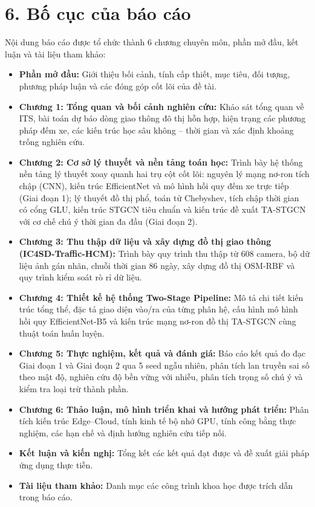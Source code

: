 \section*{6. Bố cục của báo cáo}
Nội dung báo cáo được tổ chức thành 6 chương chuyên môn, phần mở đầu, kết luận và tài liệu tham khảo:
\begin{itemize}
    \item \textbf{Phần mở đầu:} Giới thiệu bối cảnh, tính cấp thiết, mục tiêu, đối tượng, phương pháp luận và các đóng góp cốt lõi của đề tài.
    \item \textbf{Chương 1: Tổng quan và bối cảnh nghiên cứu:} Khảo sát tổng quan về ITS, bài toán dự báo dòng giao thông đô thị hỗn hợp, hiện trạng các phương pháp đếm xe, các kiến trúc học sâu không -- thời gian và xác định khoảng trống nghiên cứu.
    \item \textbf{Chương 2: Cơ sở lý thuyết và nền tảng toán học:} Trình bày hệ thống nền tảng lý thuyết xoay quanh hai trụ cột cốt lõi: nguyên lý mạng nơ-ron tích chập (CNN), kiến trúc EfficientNet và mô hình hồi quy đếm xe trực tiếp (Giai đoạn 1); lý thuyết đồ thị phổ, toán tử Chebyshev, tích chập thời gian có cổng GLU, kiến trúc STGCN tiêu chuẩn và kiến trúc đề xuất TA-STGCN với cơ chế chú ý thời gian đa đầu (Giai đoạn 2).
    \item \textbf{Chương 3: Thu thập dữ liệu và xây dựng đồ thị giao thông (IC4SD-Traffic-HCM):} Trình bày quy trình thu thập từ 608 camera, bộ dữ liệu ảnh gán nhãn, chuỗi thời gian 86 ngày, xây dựng đồ thị OSM-RBF và quy trình kiểm soát rò rỉ dữ liệu.
    \item \textbf{Chương 4: Thiết kế hệ thống Two-Stage Pipeline:} Mô tả chi tiết kiến trúc tổng thể, đặc tả giao diện vào/ra của từng phân hệ, cấu hình mô hình hồi quy EfficientNet-B5 và kiến trúc mạng nơ-ron đồ thị TA-STGCN cùng thuật toán huấn luyện.
    \item \textbf{Chương 5: Thực nghiệm, kết quả và đánh giá:} Báo cáo kết quả đo đạc Giai đoạn 1 và Giai đoạn 2 qua 5 seed ngẫu nhiên, phân tích lan truyền sai số theo mật độ, nghiên cứu độ bền vững với nhiễu, phân tích trọng số chú ý và kiểm tra loại trừ thành phần.
    \item \textbf{Chương 6: Thảo luận, mô hình triển khai và hướng phát triển:} Phân tích kiến trúc Edge--Cloud, tính kinh tế bộ nhớ GPU, tính công bằng thực nghiệm, các hạn chế và định hướng nghiên cứu tiếp nối.
    \item \textbf{Kết luận và kiến nghị:} Tổng kết các kết quả đạt được và đề xuất giải pháp ứng dụng thực tiễn.
    \item \textbf{Tài liệu tham khảo:} Danh mục các công trình khoa học được trích dẫn trong báo cáo.
\end{itemize}

